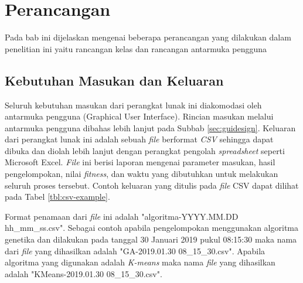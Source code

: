 \chapter{Perancangan}
\label{chap:perancangan}

Pada bab ini dijelaskan mengenai beberapa perancangan yang dilakukan dalam penelitian ini yaitu rancangan kelas dan rancangan antarmuka pengguna

\section{Kebutuhan Masukan dan Keluaran}
Seluruh kebutuhan masukan dari perangkat lunak ini diakomodasi oleh antarmuka pengguna (Graphical User Interface). Rincian masukan melalui antarmuka pengguna dibahas lebih lanjut pada Subbab \ref{sec:guidesign}. Keluaran dari perangkat lunak ini adalah sebuah \textit{file} berformat \textit{CSV} sehingga dapat dibuka dan diolah lebih lanjut dengan perangkat pengolah \textit{spreadsheet} seperti Microsoft Excel. \textit{File} ini berisi laporan mengenai parameter masukan, hasil pengelompokan, nilai \textit{fitness}, dan waktu yang dibutuhkan untuk melakukan seluruh proses tersebut. Contoh keluaran yang ditulis pada \textit{file} CSV dapat dilihat pada Tabel \ref{tbl:csv-example}. 

Format penamaan dari \textit{file} ini adalah "algoritma-YYYY.MM.DD hh{\_}mm{\_}ss.csv". Sebagai contoh apabila pengelompokan menggunakan algoritma genetika dan dilakukan pada tanggal 30 Januari 2019 pukul 08:15:30 maka nama dari \textit{file} yang dihasilkan adalah "GA-2019.01.30 08{\_}15{\_}30.csv". Apabila algoritma yang digunakan adalah \textit{K-means} maka nama \textit{file} yang dihasilkan adalah "KMeans-2019.01.30 08{\_}15{\_}30.csv".

